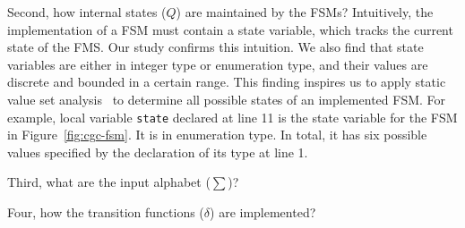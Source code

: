 Second, how internal states ($Q$) are maintained by the FSMs?
Intuitively, the implementation of a FSM must contain a state variable, 
which tracks the current state of the FMS.
Our study confirms this intuition. 
We also find that state variables are either in integer type or enumeration type,
and their values are discrete and bounded in a certain range. 
This finding inspires us to apply static value set analysis~\cite{DEEPVSA,VSA} 
to determine all possible states of an implemented FSM.
For example, local variable \texttt{state} declared at line 11
is the state variable for the FSM in Figure~\ref{fig:cgc-fsm}.
It is in enumeration type.
In total, it has six possible values specified by the declaration of 
its type at line 1. 




Third, what are the input alphabet ($\sum$)? 

Four, how the transition functions ($\delta$) are implemented?

